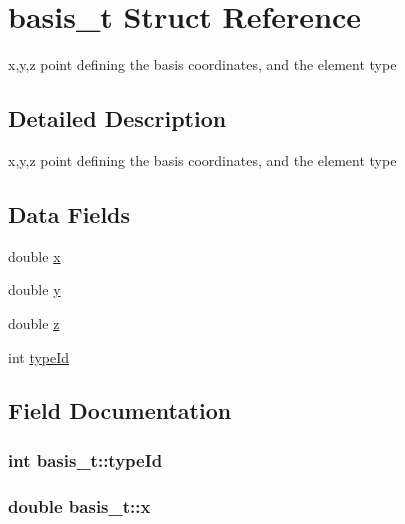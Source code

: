 \hypertarget{structbasis__t}{}\section{basis\+\_\+t Struct Reference}
\label{structbasis__t}


x,y,z point defining the basis coordinates, and the element type  




\subsection{Detailed Description}
x,y,z point defining the basis coordinates, and the element type \subsection*{Data Fields}
\begin{DoxyCompactItemize}
\item 
double \hyperlink{structbasis__t_a9703ff4ce96d3707f89d917f2791b142}{x}
\item 
double \hyperlink{structbasis__t_ad1faac3692f2d8ecc17a60f8ef94d433}{y}
\item 
double \hyperlink{structbasis__t_a63319e14c2c93f4663e9725c5608bfa6}{z}
\item 
int \hyperlink{structbasis__t_ae47185148c37c42106cdf6f0c3cd7c5b}{type\+Id}
\end{DoxyCompactItemize}


\subsection{Field Documentation}
\hypertarget{structbasis__t_ae47185148c37c42106cdf6f0c3cd7c5b}{}
\subsubsection[{type\+Id}]{\setlength{\rightskip}{0pt plus 5cm}int basis\+\_\+t\+::type\+Id}\label{structbasis__t_ae47185148c37c42106cdf6f0c3cd7c5b}
\hypertarget{structbasis__t_a9703ff4ce96d3707f89d917f2791b142}{}
\subsubsection[{x}]{\setlength{\rightskip}{0pt plus 5cm}double basis\+\_\+t\+::x}\label{structbasis__t_a9703ff4ce96d3707f89d917f2791b142}
\hypertarget{structbasis__t_ad1faac3692f2d8ecc17a60f8ef94d433}{}
